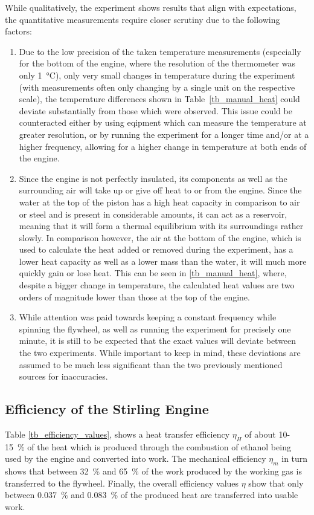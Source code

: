 \documentclass[titlepage]{article}
\begin{document}
While qualitatively, the experiment shows results that align with expectations, the quantitative measurements require closer scrutiny due to the following factors:
%
\begin{enumerate}
    \item Due to the low precision of the taken temperature measurements (especially for the bottom of the engine, where the resolution of the thermometer was only 1~°C), only very small changes in temperature during the experiment (with measurements often only changing by a single unit on the respective scale), the temperature differences shown in Table~\ref{tb_manual_heat} could deviate substantially from those which were observed. This issue could be counteracted either by using eqipment which can measure the temperature at greater resolution, or by running the experiment for a longer time and/or at a higher frequency, allowing for a higher change in temperature at both ends of the engine.
    \item Since the engine is not perfectly insulated, its components as well as the surrounding air will take up or give off heat to or from the engine. Since the water at the top of the piston has a high heat capacity in comparison to air or steel and is present in considerable amounts, it can act as a reservoir, meaning that it will form a thermal equilibrium with its surroundings rather slowly. In comparison however, the air at the bottom of the engine, which is used to calculate the heat added or removed during the experiment, has a lower heat capacity as well as a lower mass than the water, it will much more quickly gain or lose heat. This can be seen in \ref{tb_manual_heat}, where, despite a bigger change in temperature, the calculated heat values are two orders of magnitude lower than those at the top of the engine.
    \item While attention was paid towards keeping a constant frequency while spinning the flywheel, as well as running the experiment for precisely one minute, it is still to be expected that the exact values will deviate between the two experiments. While important to keep in mind, these deviations are assumed to be much less significant than the two previously mentioned sources for inaccuracies.
\end{enumerate}

\newpage
\subsection{Efficiency of the Stirling Engine}
Table \ref{tb_efficiency_values}, shows a heat transfer efficiency \(\eta_H\) of about 10-15~\% of the heat which is produced through the combustion of ethanol being used by the engine and converted into work. The mechanical efficiency \(\eta_m\) in turn shows that between 32~\% and 65~\% of the work produced by the working gas is transferred to the flywheel. Finally, the overall efficiency values \(\eta\) show that only between 0.037~\% and 0.083~\% of the produced heat are transferred into usable work.
\end{document}
